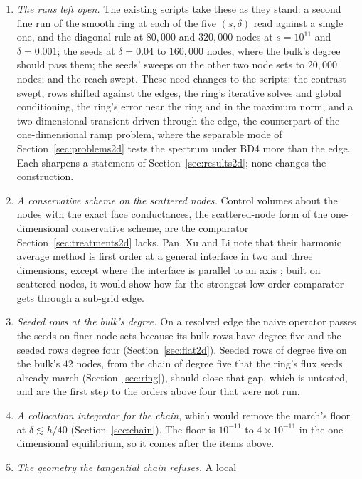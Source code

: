 \documentclass[11pt]{amsart}
\theoremstyle{definition}
\theoremstyle{remark}
\newcommand{\sci}[2]{#1 \times 10^{#2}}
\begin{document}
\begin{enumerate}
\item \emph{The runs left open.} The existing scripts take these as they
  stand: a
  second fine run of the smooth ring at each of the five $(s, \delta)$ read
  against a single one, and the diagonal rule at $80{,}000$ and $320{,}000$ nodes at
  $s = 10^{11}$ and $\delta = 0.001$; the seeds at $\delta = 0.04$ to
  $160{,}000$ nodes, where the bulk's degree should pass them; the seeds'
  sweeps on the other two node sets to $20{,}000$ nodes; and the reach
  swept. These need changes to the scripts: the contrast swept, rows
  shifted against the edges, the ring's iterative solves and global
  conditioning, the ring's error near the ring and in the maximum norm, and
  a two-dimensional transient driven through the edge, the counterpart of
  the one-dimensional ramp problem, where the separable mode of
  Section~\ref{sec:problems2d} tests the spectrum under BD4 more than the
  edge. Each sharpens a
  statement of Section~\ref{sec:results2d}; none changes the construction.
\item \emph{A conservative scheme on the scattered nodes.} Control volumes
  about the nodes with the exact face conductances, the scattered-node
  form of the one-dimensional conservative scheme, are the comparator
  Section~\ref{sec:treatments2d} lacks. Pan, Xu and Li note that their
  harmonic average method is first order at a general interface in two and
  three dimensions, except where the interface is parallel to an axis
  \cite{PanXuLi2026}; built on scattered nodes, it would show how far the
  strongest low-order comparator gets through a sub-grid edge.
\item \emph{Seeded rows at the bulk's degree.} On a resolved edge the naive
  operator passes the seeds on finer node sets because its bulk rows have
  degree five and the seeded rows degree four
  (Section~\ref{sec:flat2d}). Seeded rows of degree five on the bulk's
  $42$ nodes, from the chain of degree five that the ring's flux seeds
  already march (Section~\ref{sec:ring}), should close that gap, which is
  untested, and are the first step to the orders above four that were not
  run.
\item \emph{A collocation integrator for the chain}, which would remove the
  march's floor at $\delta \lesssim h/40$ (Section~\ref{sec:chain}). The
  floor is $10^{-11}$ to $\sci{4}{-11}$ in the one-dimensional equilibrium,
  so it comes after the items above.
\item \emph{The geometry the tangential chain refuses.} A local

\end{enumerate}
\end{document}
